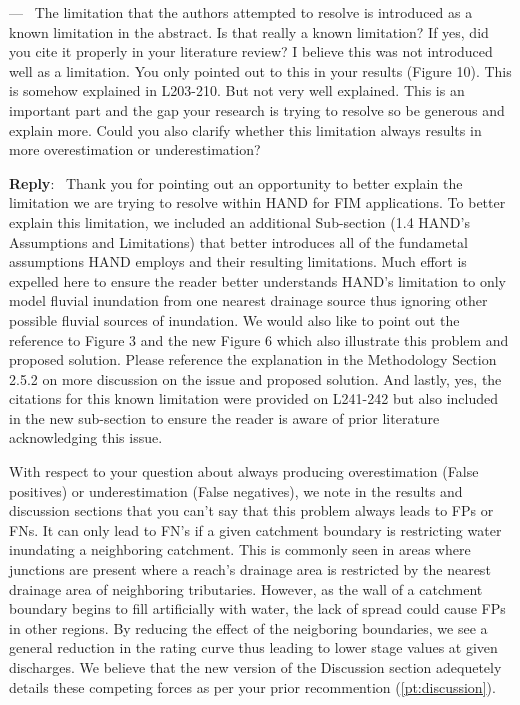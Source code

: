\documentclass[11pt]{article}
\newcounter{reviewer}
\newcounter{point}[reviewer]
\renewcommand{\thepoint}{P\,\thereviewer.\arabic{point}}
\newenvironment{point}
   {\refstepcounter{point} \bigskip \noindent {\textbf{Reviewer~Point~\thepoint} } ---\ }
   {\par }
\newenvironment{reply}
   {\medskip \noindent \begin{sf}\textbf{Reply}:\  }
   {\medskip \end{sf}}
\begin{document}
\begin{point}
The limitation that the authors attempted to resolve is introduced as a known limitation in the abstract.
Is that really a known limitation?
If yes, did you cite it properly in your literature review?
I believe this was not introduced well as a limitation.
You only pointed out to this in your results (Figure 10).
This is somehow explained in L203-210.
But not very well explained.
This is an important part and the gap your research is trying to resolve so be generous and explain more.
Could you also clarify whether this limitation always results in more overestimation or underestimation? 
\label{pt:bar}
\end{point}

\begin{reply}
Thank you for pointing out an opportunity to better explain the limitation we are trying to resolve within HAND for FIM applications.
To better explain this limitation, we included an additional Sub-section (1.4 HAND's Assumptions and Limitations) that better introduces all of the fundametal assumptions HAND employs and their resulting limitations.
Much effort is expelled here to ensure the reader better understands HAND's limitation to only model fluvial inundation from one nearest drainage source thus ignoring other possible fluvial sources of inundation.
We would also like to point out the reference to Figure 3 and the new Figure 6 which also illustrate this problem and proposed solution.
Please reference the explanation in the Methodology Section 2.5.2 on more discussion on the issue and proposed solution.
And lastly, yes, the citations for this known limitation were provided on L241-242 but also included in the new sub-section to ensure the reader is aware of prior literature acknowledging this issue.

With respect to your question about always producing overestimation (False positives) or underestimation (False negatives), we note in the results and discussion sections that you can't say that this problem always leads to FPs or FNs.
It can only lead to FN's if a given catchment boundary is restricting water inundating a neighboring catchment.
This is commonly seen in areas where junctions are present where a reach's drainage area is restricted by the nearest drainage area of neighboring tributaries.
However, as the wall of a catchment boundary begins to fill artificially with water, the lack of spread could cause FPs in other regions.
By reducing the effect of the neigboring boundaries, we see a general reduction in the rating curve thus leading to lower stage values at given discharges.
We believe that the new version of the Discussion section adequetely details these competing forces as per your prior recommention (\ref{pt:discussion}).
\end{reply}
\end{document}
